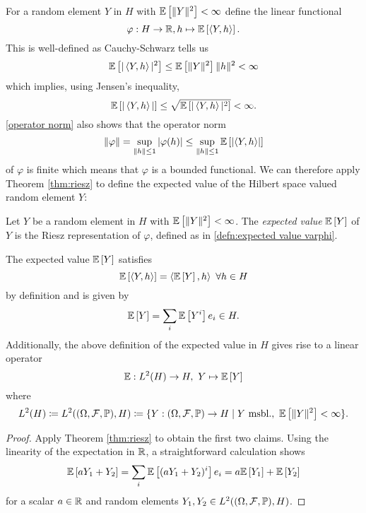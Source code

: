 For a random element $Y$ in $H$ with $\mathbb{E}\left[\|Y\|^2\right] < \infty$ define the linear functional 
\begin{equation} \label{defn:expected value varphi}
    \varphi: H \to \mathbb{R}, h \mapsto \mathbb{E}\left[\left\langle Y, h \right\rangle\right].
\end{equation}
This is well-defined as Cauchy-Schwarz tells us 
\begin{equation} \label{operator norm}
        \mathbb{E}\left[| \left\langle Y, h \right\rangle |^2\right] \leq \mathbb{E}\left[\|Y\|^2\right]\|h\|^2 < \infty
\end{equation} 
which implies, using Jensen's inequality, 
\begin{equation*}
    \mathbb{E}\left[| \left\langle Y, h \right\rangle |\right] \leq \sqrt{\mathbb{E}\left[| \left\langle Y, h \right\rangle |^2\right]} < \infty.
\end{equation*}
\eqref{operator norm} also shows that the operator norm 
\begin{equation*}
        \| \varphi \| = \sup\limits_{\| h \| \leq 1} |\varphi(h)| \leq \sup\limits_{\| h \| \leq 1} \mathbb{E}\left[| \langle Y, h \rangle |\right]
\end{equation*}
of $\varphi$ is finite which means that $\varphi$ is a bounded functional. We can therefore apply Theorem \ref{thm:riesz} to define the expected value of the Hilbert space valued random element $Y$:

\begin{defn}
    Let $Y$ be a random element in $H$ with $\mathbb{E}\left[\|Y\|^2\right] < \infty$. The \textit{expected value} $\mathbb{E}\left[Y\right]$ of $Y$ is the Riesz representation of $\varphi$, defined as in \eqref{defn:expected value varphi}.
\end{defn}

\begin{remark}
    The expected value $\mathbb{E}\left[Y\right]$ satisfies
    \[ \mathbb{E}\left[\langle Y, h \rangle\right] = \left\langle \mathbb{E}\left[Y\right], h \right\rangle \ \forall h \in H \]
    by definition and is given by
    \[ \mathbb{E}\left[Y\right] = \sum\limits_i \mathbb{E}\left[Y^i\right] e_i \in H. \]
    Additionally, the above definition of the expected value in $H$ gives rise to a linear operator
    \[ \mathbb{E}: L^2(H)  \to H, \ Y \mapsto \mathbb{E}\left[Y\right] \]
    where 
    \[ L^2(H) \coloneqq L^2((\Omega, \mathcal{F}, \mathbb{P}),  H) \coloneqq \{ Y: (\Omega, \mathcal{F}, \mathbb{P}) \to H \mid Y \text{ msbl.}, \ \mathbb{E}\left[\|Y\|^2\right] < \infty \}. \]
\end{remark}
\begin{proof}
    Apply Theorem \ref{thm:riesz} to obtain the first two claims. Using the linearity of the expectation in $\mathbb{R}$, a straightforward calculation shows
    \[ \mathbb{E}\left[a Y_1 + Y_2\right] = \sum\limits_i \mathbb{E}\left[(a Y_1 + Y_2)^i\right] e_i = a \mathbb{E}\left[Y_1\right] + \mathbb{E}\left[Y_2\right]  \]
    for a scalar $a \in \mathbb{R}$ and random elements $Y_1, Y_2 \in L^2((\Omega, \mathcal{F}, \mathbb{P}),  H)$.
\end{proof}

